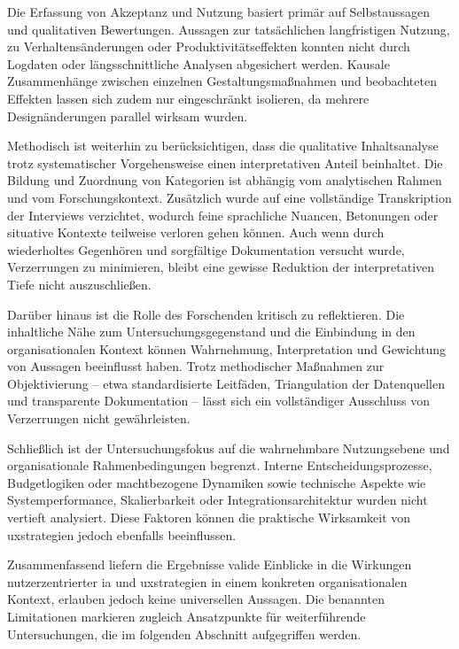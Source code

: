 Die Erfassung von Akzeptanz und Nutzung basiert primär auf Selbstaussagen und qualitativen Bewertungen. Aussagen zur tatsächlichen langfristigen Nutzung, zu Verhaltensänderungen oder Produktivitätseffekten konnten nicht durch Logdaten oder längsschnittliche Analysen abgesichert werden. Kausale Zusammenhänge zwischen einzelnen Gestaltungsmaßnahmen und beobachteten Effekten lassen sich zudem nur eingeschränkt isolieren, da mehrere Designänderungen parallel wirksam wurden.

Methodisch ist weiterhin zu berücksichtigen, dass die qualitative Inhaltsanalyse trotz systematischer Vorgehensweise einen interpretativen Anteil beinhaltet. Die Bildung und Zuordnung von Kategorien ist abhängig vom analytischen Rahmen und vom Forschungskontext. Zusätzlich wurde auf eine vollständige Transkription der Interviews verzichtet, wodurch feine sprachliche Nuancen, Betonungen oder situative Kontexte teilweise verloren gehen können. Auch wenn durch wiederholtes Gegenhören und sorgfältige Dokumentation versucht wurde, Verzerrungen zu minimieren, bleibt eine gewisse Reduktion der interpretativen Tiefe nicht auszuschließen.

Darüber hinaus ist die Rolle des Forschenden kritisch zu reflektieren. Die inhaltliche Nähe zum Untersuchungsgegenstand und die Einbindung in den organisationalen Kontext können Wahrnehmung, Interpretation und Gewichtung von Aussagen beeinflusst haben. Trotz methodischer Maßnahmen zur Objektivierung -- etwa standardisierte Leitfäden, Triangulation der Datenquellen und transparente Dokumentation -- lässt sich ein vollständiger Ausschluss von Verzerrungen nicht gewährleisten.

Schließlich ist der Untersuchungsfokus auf die wahrnehmbare Nutzungsebene und organisationale Rahmenbedingungen begrenzt. Interne Entscheidungsprozesse, Budgetlogiken oder machtbezogene Dynamiken sowie technische Aspekte wie Systemperformance, Skalierbarkeit oder Integrationsarchitektur wurden nicht vertieft analysiert. Diese Faktoren können die praktische Wirksamkeit von \Gls{uxstrategien} jedoch ebenfalls beeinflussen.

Zusammenfassend liefern die Ergebnisse valide Einblicke in die Wirkungen nutzerzentrierter \Gls{ia} und \Gls{uxstrategien} in einem konkreten organisationalen Kontext, erlauben jedoch keine universellen Aussagen. Die benannten Limitationen markieren zugleich Ansatzpunkte für weiterführende Untersuchungen, die im folgenden Abschnitt aufgegriffen werden.
